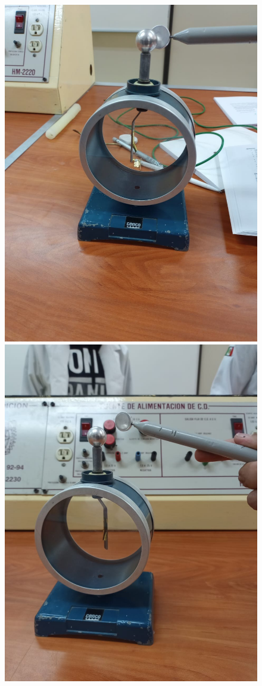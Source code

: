 \documentclass[10pt]{article}
\begin{document}
\begin{multicols}{2}
\begin{figure}[h]
\centering
\includegraphics[scale=0.07]{p5}
\includegraphics[scale=0.07]{p6}

\end{figure}
\end{multicols}
\end{document}
